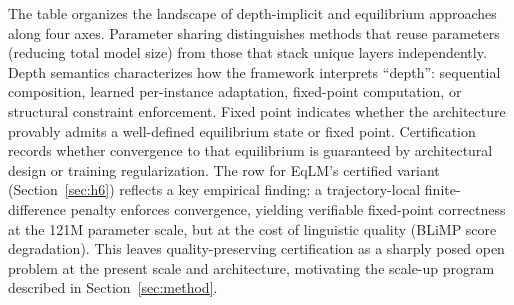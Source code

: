 \begin{table}[H]
\centering
\caption{Equilibrium-theoretic and depth-implicit architectures: parameter sharing, fixed-point semantics,
convergence guarantees, and certification status. No single architecture achieves certified convergence while
preserving linguistic quality at the BabyLM scale in the present work.}
\label{tab:equil_comparison}
\end{table}

The table organizes the landscape of depth-implicit and equilibrium approaches along four axes.
Parameter sharing distinguishes methods that reuse parameters (reducing total model size) from those that stack
unique layers independently.
Depth semantics characterizes how the framework interprets ``depth'': sequential composition, learned
per-instance adaptation, fixed-point computation, or structural constraint enforcement.
Fixed point indicates whether the architecture provably admits a well-defined equilibrium state or fixed point.
Certification records whether convergence to that equilibrium is guaranteed by architectural design or training
regularization.
The row for EqLM's certified variant (Section~\ref{sec:h6}) reflects a key empirical finding: a
trajectory-local finite-difference penalty enforces convergence, yielding verifiable fixed-point correctness at
the 121M parameter scale, but at the cost of linguistic quality (BLiMP score degradation).
This leaves quality-preserving certification as a sharply posed open problem at the present scale and
architecture, motivating the scale-up program described in Section~\ref{sec:method}.
